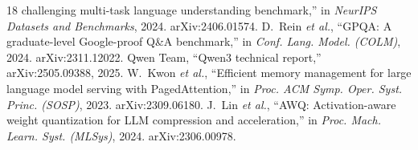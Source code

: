 \documentclass[conference]{IEEEtran}
\begin{document}
\begin{thebibliography}{18}
challenging multi-task language understanding benchmark,'' in \emph{NeurIPS Datasets
and Benchmarks}, 2024. arXiv:2406.01574.
 D.~Rein \emph{et al.}, ``GPQA: A graduate-level Google-proof
Q\&A benchmark,'' in \emph{Conf. Lang. Model. (COLM)}, 2024. arXiv:2311.12022.
 Qwen Team, ``Qwen3 technical report,'' arXiv:2505.09388, 2025.
 W.~Kwon \emph{et al.}, ``Efficient memory management for large
language model serving with PagedAttention,'' in \emph{Proc. ACM Symp. Oper. Syst.
Princ. (SOSP)}, 2023. arXiv:2309.06180.
 J.~Lin \emph{et al.}, ``AWQ: Activation-aware weight quantization
for LLM compression and acceleration,'' in \emph{Proc. Mach. Learn. Syst. (MLSys)},
2024. arXiv:2306.00978.
\end{thebibliography}
\end{document}

